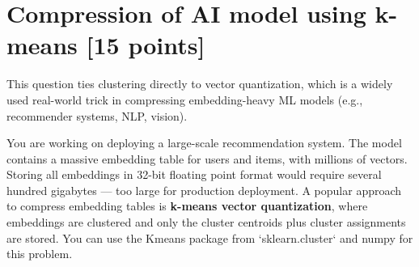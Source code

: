 \documentclass[twoside,10pt]{article}
\begin{document}
\section{Compression of AI model using k-means [15 points]}

This question ties clustering directly to vector quantization, which is a widely used real-world trick in compressing embedding-heavy ML models (e.g., recommender systems, NLP, vision).

You are working on deploying a large-scale recommendation system. 
The model contains a massive embedding table for users and items, with millions of vectors. 
Storing all embeddings in 32-bit floating point format would require several hundred gigabytes --- too large for production deployment. 
A popular approach to compress embedding tables is \textbf{k-means vector quantization}, 
where embeddings are clustered and only the cluster centroids plus cluster assignments are stored. You can use the Kmeans package from `sklearn.cluster` and numpy for this problem.
\end{document}
